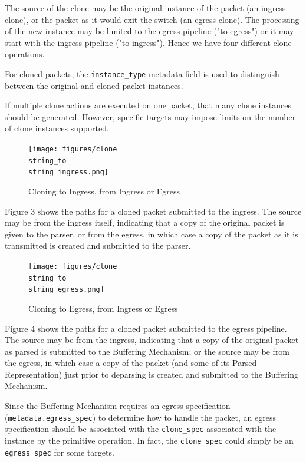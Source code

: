 \documentclass[12pt]{article}
\begin{document}
The source of the clone may be the original instance of the packet (an ingress 
clone), or the packet as it would exit the switch (an egress clone). The processing 
of the new instance may be limited to the egress pipeline ("to egress") or 
it may start with the ingress pipeline ("to ingress").  Hence we have four 
different clone operations.

For cloned packets, the \texttt{instance_type} metadata field is used to distinguish 
between the original and cloned packet instances. 

If multiple clone actions are executed on one packet, that many clone instances 
should be generated.  However, specific targets may impose limits on the number 
of clone instances supported.


\begin{figure}[h!]
    \centering
    \texttt{[image: figures/clone\\string\_to\\string\_ingress.png]}
    \caption{Cloning to Ingress, from Ingress or Egress}
    \label{fig:ingressclone}
\end{figure}


Figure 3 shows the paths for a cloned packet submitted to the ingress.  The 
source may be from the ingress itself, indicating that a copy of the original 
packet is given to the parser, or from the egress, in which case a copy of 
the packet as it is transmitted is created and submitted to the parser. 


\begin{figure}[h!]
    \centering
    \texttt{[image: figures/clone\\string\_to\\string\_egress.png]}
    \caption{Cloning to Egress, from Ingress or Egress}
    \label{fig:egressclone}
\end{figure}

Figure 4 shows the paths for a cloned packet submitted to the egress pipeline. 
 The source may be from the ingress, indicating that a copy of the original 
packet as parsed is submitted to the Buffering Mechanism; or the source may 
be from the egress, in which case a copy of the packet (and some of its Parsed 
Representation) just prior to deparsing is created and submitted to the Buffering 
Mechanism. 

Since the Buffering Mechanism requires an egress specification (\texttt{metadata.egress_spec}) 
to determine how to handle the packet, an egress specification should be associated 
with the \texttt{clone_spec} associated with the instance by the primitive operation. 
In fact, the \texttt{clone_spec} could simply be an \texttt{egress_spec} for some targets.
\end{document}
